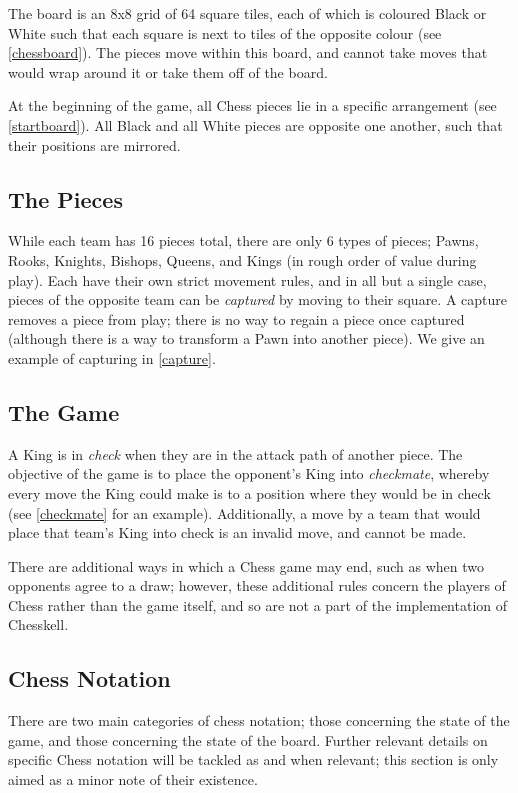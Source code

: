 \documentclass[12pt, a4paper, bibliography=totocnumbered]{scrreprt}
\begin{document}
The board is an 8x8 grid of 64 square tiles, each of which is coloured Black or White such that each square is next to tiles of the opposite colour (see \cref{chessboard}). The pieces move within this board, and cannot take moves that would wrap around it or take them off of the board.

At the beginning of the game, all Chess pieces lie in a specific arrangement (see \cref{startboard}). All Black and all White pieces are opposite one another, such that their positions are mirrored.

\subsection{The Pieces}

While each team has 16 pieces total, there are only 6 types of pieces; Pawns, Rooks, Knights, Bishops, Queens, and Kings (in rough order of value during play). Each have their own strict movement rules, and in all but a single case, pieces of the opposite team can be \emph{captured} by moving to their square. A capture removes a piece from play; there is no way to regain a piece once captured (although there is a way to transform a Pawn into another piece). We give an example of capturing in \cref{capture}.

\subsection{The Game}

A King is in \emph{check} when they are in the attack path of another piece. The objective of the game is to place the opponent's King into \emph{checkmate}, whereby every move the King could make is to a position where they would be in check (see \cref{checkmate} for an example). Additionally, a move by a team that would place that team's King into check is an invalid move, and cannot be made.

There are additional ways in which a Chess game may end, such as when two opponents agree to a draw; however, these additional rules concern the players of Chess rather than the game itself, and so are not a part of the implementation of Chesskell.

\subsection{Chess Notation} \label{fensection}

There are two main categories of chess notation; those concerning the state of the game, and those concerning the state of the board. Further relevant details on specific Chess notation will be tackled as and when relevant; this section is only aimed as a minor note of their existence.
\end{document}
